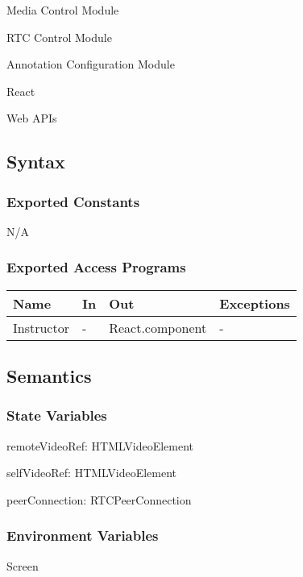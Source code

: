 \documentclass[12pt, titlepage]{article}
\begin{document}
\noindent Media Control Module

\noindent RTC Control Module

\noindent Annotation Configuration Module

\noindent React

\noindent Web APIs

\subsection{Syntax}

\subsubsection{Exported Constants}

N/A

\subsubsection{Exported Access Programs}

\begin{center}
  \begin{tabular}{p{4cm} p{4cm} p{4cm} p{2cm}}
    \hline
    \textbf{Name}    & \textbf{In} & \textbf{Out}          & \textbf{Exceptions} \\
    \hline
    Instructor & -     & React.component & -             \\
    \hline
  \end{tabular}
\end{center}

\subsection{Semantics}

\subsubsection{State Variables}

\noindent remoteVideoRef: HTMLVideoElement

\noindent selfVideoRef: HTMLVideoElement

\noindent peerConnection: RTCPeerConnection

\subsubsection{Environment Variables}

\noindent Screen
\end{document}
